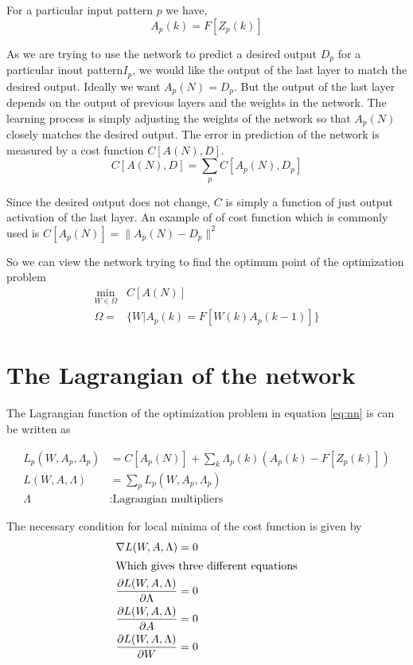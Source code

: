 \documentclass[10pt]{article}
\def\pdiff#1#2{ {\partial #1 \over \partial #2}}
\begin{document}
For a particular input pattern $p$ we have,
$$A_p(k) = F\left[Z_p(k)\right]$$

As we are trying to use the network to predict a desired output $D_p$ for a particular inout pattern$I_p$, we would like the output of the last layer to match the desired output. Ideally we want $A_p(N) = D_p$. 
But the output of the last layer depends on the output of previous layers and the weights in the network. The learning process is simply adjusting the weights of the network so that $A_p(N)$ closely matches the desired output. 
The error in prediction of the network is measured by a cost function $C[A(N) , D]$.
$$C[A(N) , D]=\sum_pC[A_p(N) , D_p]$$

Since the desired output does not change, $C$ is simply a function of just output activation of the last layer. An example of of cost function which is commonly used is $C[A_p(N)] =\|A_p(N) - D_p\|^2$



So we can view the network trying to find the optimum point of the optimization problem
\begin{align}
\min_{W\in \Omega} & C[A(N)] \label{eq:nn}\\
\Omega  =& \{W| A_p(k)= F\left[W(k)A_p(k-1)\right]\} \nonumber
\end{align}


\section{The Lagrangian of the network}

The Lagrangian function of the optimization problem  in equation \ref{eq:nn} is can be written as

\begin{align}
L_p(W,A_p,\Lambda_p) &= C\left[A_p(N)\right] + \sum_k \Lambda_p(k)\left( A_p(k) - F\left[Z_p(k)\right]\right)\\
L(W,A,\Lambda) &= \sum_p L_p(W,A_p,\Lambda_p)\\
\Lambda &: \mbox{Lagrangian multipliers}\nonumber
\end{align}

The necessary condition for local minima of the cost function is given by
\begin{align}
	\nabla L(W,A,\Lambda) &=0\\
	\intertext{Which gives three different equations}
	\pdiff{L(W,A,\Lambda)}{\Lambda}&=0 \label{eq:derL}\\
	\pdiff{L(W,A,\Lambda)}{A}&=0 \label{eq:derA}\\
	\pdiff{L(W,A,\Lambda)}{W}&=0 \label{eq:derW}
\end{align}
\end{document}
